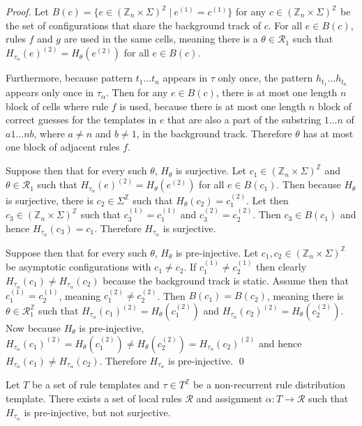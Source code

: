 \documentclass[runningheads]{llncs}
\newcommand{\Z}{\mathbb{Z}}
\newcommand{\set}[2]{\{ #1 \: | \: #2 \}}
\begin{document}
\begin{proof}
Let  $B(c) = \set{e \in (\Z_n \times \Sigma)^\Z}{e^{(1)} = c^{(1)}}$ for any $c\in (\Z_n \times \Sigma)^\Z$ be the set of configurations that share the background track of $c$. For all $e \in B(c)$, rules $f$ and $g$ are used in the same cells, meaning there is a $\theta \in \mathcal{R}_1$ such that $H_{\tau_\alpha} (e)^{(2)} = H_\theta (e^{(2)})$ for all $e \in B(c)$. 

Furthermore, because pattern $t_1 \ldots t_n$ appears in $\tau$ only once, the pattern $h_{t_1}\ldots h_{t_n}$ appears only once in $\tau_\alpha$. Then for any $e \in B(c)$, there is at most one length $n$ block of cells where rule $f$ is used, because there is at most one length $n$ block of correct guesses for the templates in $e$ that are also a part of the substring $1\ldots n$ of $a 1 \ldots n b$, where $a \neq n$ and $b \neq 1$, in the background track. Therefore $\theta$ has at most one block of adjacent rules $f$.

Suppose then that for every such $\theta$, $H_\theta$ is surjective. Let $c_1 \in (\Z_n \times \Sigma)^\Z$ and $\theta \in \mathcal{R}_1$ such that $H_{\tau_\alpha} (e)^{(2)} = H_\theta (e^{(2)})$ for all $e \in B(c_1)$. Then because $H_\theta$ is surjective, there is $c_2 \in \Sigma^\Z$ such that $H_\theta (c_2) = c_1^{(2)}$. Let then $c_3 \in (\Z_n \times \Sigma)^\Z$ such that $c_3^{(1)} = c_1^{(1)}$ and $c_3^{(2)} = c_2^{(2)}$. Then $c_3 \in B(c_1)$ and hence $H_{\tau_\alpha} (c_3) = c_1$. Therefore $H_{\tau_\alpha}$ is surjective.

Suppose then that for every such $\theta$, $H_\theta$ is pre-injective. Let $c_1,c_2 \in (\Z_n \times \Sigma)^\Z$  be asymptotic configurations with $c_1 \neq c_2$. If $c_1^{(1)} \neq c_2^{(1)}$ then clearly $H_{\tau_\alpha} (c_1) \neq H_{\tau_\alpha} (c_2)$ because the background track is static. Assume then that $c_1^{(1)} = c_2^{(1)}$, meaning $c_1^{(2)} \neq c_2^{(2)}$. Then $B(c_1) = B(c_2)$, meaning there is $\theta \in \mathcal{R}_1^\Z$ such that $H_{\tau_\alpha} (c_1)^{(2)} = H_\theta (c_1^{(2)})$ and $H_{\tau_\alpha} (c_2)^{(2)} = H_\theta (c_2^{(2)})$. Now because $H_\theta$ is pre-injective, $H_{\tau_\alpha} (c_1)^{(2)} = H_\theta (c_1^{(2)}) \neq  H_\theta (c_2^{(2)}) = H_{\tau_\alpha} (c_2)^{(2)}$  and hence $H_{\tau_\alpha} (c_1) \neq H_{\tau_\alpha} (c_2)$. Therefore $H_{\tau_\alpha}$ is pre-injective.
\qed
\end{proof}

\begin{theorem}
Let $T$ be a set of rule templates and $\tau \in T^\Z$ be a non-recurrent rule distribution template. There exists a set of local rules $\mathcal{R}$ and assignment $\alpha: T \rightarrow \mathcal{R}$ such that $H_{\tau_\alpha}$ is pre-injective, but not surjective.
\end{theorem}
\end{document}
